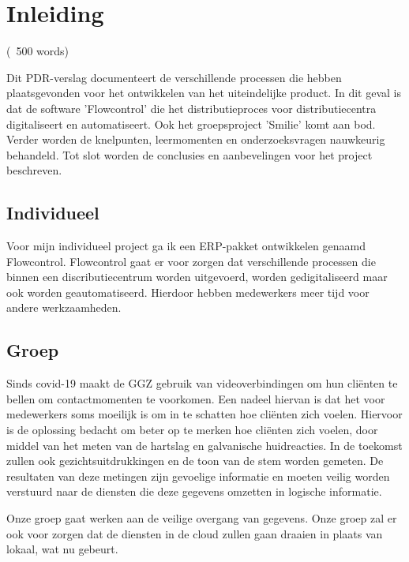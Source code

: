 \chapter{Inleiding}
\label{ch:introduction}
(~500 words)

Dit PDR-verslag documenteert de verschillende processen die hebben plaatsgevonden voor het ontwikkelen van het
uiteindelijke product.
In dit geval is dat de software 'Flowcontrol' die het distributieproces voor distributiecentra digitaliseert en
automatiseert.
Ook het groepsproject 'Smilie' komt aan bod.
Verder worden de knelpunten, leermomenten en onderzoeksvragen nauwkeurig behandeld.
Tot slot worden de conclusies en aanbevelingen voor het project beschreven.


\section*{Individueel}
Voor mijn individueel project ga ik een ERP-pakket ontwikkelen genaamd Flowcontrol.
Flowcontrol gaat er voor zorgen dat verschillende processen die binnen een discributiecentrum worden uitgevoerd,
worden gedigitaliseerd maar ook worden geautomatiseerd.
Hierdoor hebben medewerkers meer tijd voor andere werkzaamheden.

\section*{Groep}
Sinds covid-19 maakt de GGZ gebruik van videoverbindingen om hun cliënten te bellen om contactmomenten te voorkomen.
Een nadeel hiervan is dat het voor medewerkers soms moeilijk is om in te schatten hoe cliënten zich voelen.
Hiervoor is de oplossing bedacht om beter op te merken hoe cliënten zich voelen, door middel van het meten van de
hartslag en
galvanische huidreacties.
In de toekomst zullen ook gezichtsuitdrukkingen en de toon van de stem worden gemeten.
De resultaten van deze metingen zijn gevoelige informatie en moeten veilig worden verstuurd naar de diensten die deze gegevens omzetten in logische informatie.

Onze groep gaat werken aan de veilige overgang van gegevens.
Onze groep zal er ook voor zorgen dat de diensten in de cloud zullen gaan draaien in plaats van lokaal, wat nu gebeurt.
